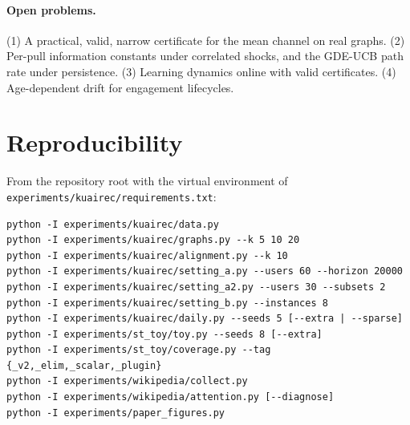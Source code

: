 \documentclass[11pt]{article}
\theoremstyle{definition}
\theoremstyle{remark}
\begin{document}
\paragraph{Open problems.} (1) A practical, valid, narrow certificate for the mean channel on real graphs. (2) Per-pull information constants under correlated shocks, and the GDE-UCB path rate under persistence. (3) Learning dynamics online with valid certificates. (4) Age-dependent drift for engagement lifecycles.

\section{Reproducibility}\label{sec:repro}

From the repository root with the virtual environment of \texttt{experiments/kuairec/requirements.txt}:
\begin{verbatim}
python -I experiments/kuairec/data.py
python -I experiments/kuairec/graphs.py --k 5 10 20
python -I experiments/kuairec/alignment.py --k 10
python -I experiments/kuairec/setting_a.py --users 60 --horizon 20000
python -I experiments/kuairec/setting_a2.py --users 30 --subsets 2
python -I experiments/kuairec/setting_b.py --instances 8
python -I experiments/kuairec/daily.py --seeds 5 [--extra | --sparse]
python -I experiments/st_toy/toy.py --seeds 8 [--extra]
python -I experiments/st_toy/coverage.py --tag {_v2,_elim,_scalar,_plugin}
python -I experiments/wikipedia/collect.py
python -I experiments/wikipedia/attention.py [--diagnose]
python -I experiments/paper_figures.py
\end{verbatim}
\end{document}
